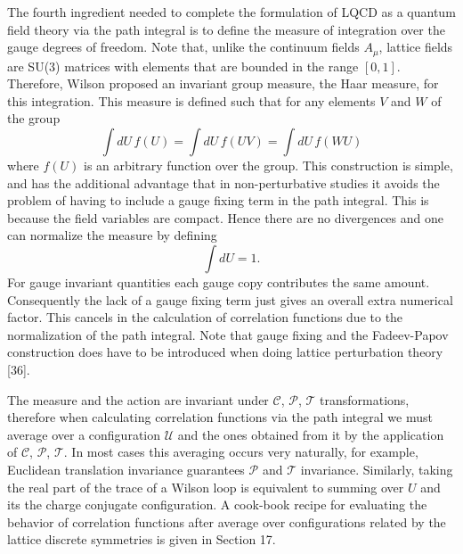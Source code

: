 The fourth ingredient needed to complete the formulation of LQCD as a quantum
field theory via the path integral is to define the measure of integration
over the gauge degrees of freedom. Note that, unlike the continuum fields
$A_\mu$, lattice fields are SU(3) matrices with elements that are bounded in
the range $[0,1]$. Therefore, Wilson proposed an invariant group measure, the
Haar measure, for this integration. This measure is defined such that for any
elements $V$ and $W$ of the group
\begin{equation}
\label{eq:haarmeasure}
\int dU\, f(U) = \int dU\, f(UV) = \int dU\, f(WU)
\end{equation}
where $f(U)$ is an arbitrary function over the group. This construction is
simple, and has the additional advantage that in non-perturbative studies it
avoids the problem of having to include a gauge fixing term in the path
integral. This is because the field variables are compact. Hence there are no
divergences and one can normalize the measure by defining
\begin{equation}
\label{eq:haarnorm}
\int dU = 1 .
\end{equation}
For gauge invariant quantities each gauge copy contributes the same amount.
Consequently the lack of a gauge fixing term just gives an overall extra
numerical factor. This cancels in the calculation of correlation functions
due to the normalization of the path integral. Note that gauge fixing and the
Fadeev-Papov construction does have to be introduced when doing lattice
perturbation theory [36].

The measure and the action are invariant under $\mathcal{C}$, $\mathcal{P}$,
$\mathcal{T}$ transformations, therefore when calculating correlation
functions via the path integral we must average over a configuration
$\mathcal{U}$ and the ones obtained from it by the application of
$\mathcal{C}$, $\mathcal{P}$, $\mathcal{T}$. In most cases this averaging
occurs very naturally, for example, Euclidean translation invariance
guarantees $\mathcal{P}$ and $\mathcal{T}$ invariance. Similarly, taking the
real part of the trace of a Wilson loop is equivalent to summing over $U$ and
its the charge conjugate configuration. A cook-book recipe for evaluating the
behavior of correlation functions after average over configurations related
by the lattice discrete symmetries is given in Section 17.

